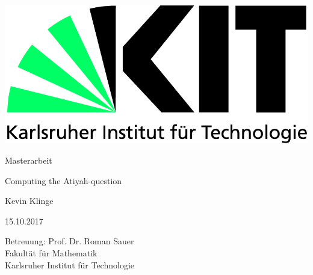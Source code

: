 \documentclass[12pt,a4paper]{scrartcl}
\theoremstyle{italic}
\theoremstyle{plain}
\begin{document}
\pagestyle{empty}
\begin{titlepage}

	\includegraphics[scale=0.45]{kit-logo.jpg} 
	\vspace*{2cm} 

	\begin{center} \large 

		Masterarbeit
		\vspace*{2cm}

		{\huge Computing the Atiyah-question}
		\vspace*{2.5cm}

		Kevin Klinge
		\vspace*{1.5cm}

		15.10.2017
		\vspace*{4.5cm}


		Betreuung: Prof. Dr. Roman Sauer \\[1cm]
		Fakultät für Mathematik \\[1cm]
		Karlsruher Institut für Technologie

	\end{center}
\end{titlepage}

\tableofcontents

\newpage
 
\pagestyle{headings}
















\end{document}
